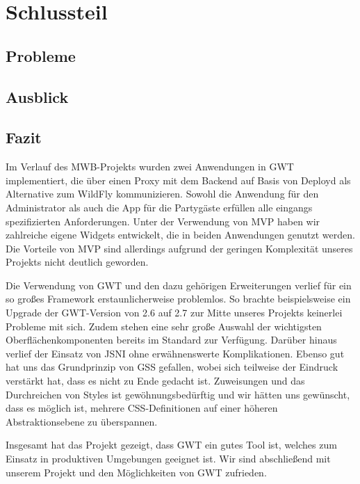 \section{Schlussteil}
\subsection{Probleme}

\subsection{Ausblick}

\subsection{Fazit}
Im Verlauf des MWB-Projekts wurden zwei Anwendungen in GWT implementiert, die über einen Proxy mit dem Backend auf Basis von Deployd als Alternative zum WildFly kommunizieren. Sowohl die Anwendung für den Administrator als auch die App für die Partygäste erfüllen alle eingangs spezifizierten Anforderungen. Unter der Verwendung von MVP haben wir zahlreiche eigene Widgets entwickelt, die in beiden Anwendungen genutzt werden. Die Vorteile von MVP sind allerdings aufgrund der geringen Komplexität unseres Projekts nicht deutlich geworden. 

Die Verwendung von GWT und den dazu gehörigen Erweiterungen verlief für ein so großes Framework erstaunlicherweise problemlos.
So brachte beispielsweise ein Upgrade der GWT-Version von 2.6 auf 2.7 zur Mitte unseres Projekts keinerlei Probleme mit sich. Zudem stehen eine sehr große Auswahl der wichtigsten Oberflächenkomponenten bereits im Standard zur Verfügung. Darüber hinaus verlief der Einsatz von JSNI  ohne erwähnenswerte Komplikationen. Ebenso gut hat uns das Grundprinzip von GSS gefallen, wobei sich teilweise der Eindruck verstärkt hat, dass es nicht zu Ende gedacht ist. Zuweisungen und das Durchreichen von Styles ist gewöhnungsbedürftig und wir hätten uns gewünscht, dass es möglich ist, mehrere CSS-Definitionen auf einer höheren Abstraktionsebene zu überspannen.

Insgesamt hat das Projekt gezeigt, dass GWT ein gutes Tool ist, welches zum Einsatz in produktiven Umgebungen geeignet ist. Wir sind abschließend mit unserem Projekt und den Möglichkeiten von GWT zufrieden.


